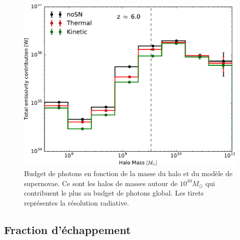 \begin{figure}
	\centering
	\includegraphics[width=.95\linewidth]{img/03/totout.pdf} 
    \caption[Budget de photon]{Budget de photons en fonction de la masse du halo et du modèle de supernovae. 
    Ce sont les halos de masses autour de $10^{10} M_\odot$ qui contribuent le plus au budget de photons global.
    Les tirets représentes la résolution radiative.
 	\label{fig:budget}}
\end{figure}

\subsection{Fraction d'échappement}
\label{sec:fesc}

